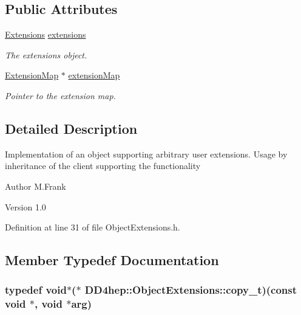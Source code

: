 \subsection*{Public Attributes}
\begin{DoxyCompactItemize}
\item 
\hyperlink{class_d_d4hep_1_1_object_extensions_a882c1e22567a450f60d83eb735dd3532}{Extensions} \hyperlink{class_d_d4hep_1_1_object_extensions_ac96afa01e09dec7a795c88b67c054007}{extensions}
\begin{DoxyCompactList}\small\item\em The extensions object. \item\end{DoxyCompactList}\item 
\hyperlink{class_d_d4hep_1_1_object_extensions_a22c0e42d5fdc9f3fda39c2c3bec14341}{ExtensionMap} $\ast$ \hyperlink{class_d_d4hep_1_1_object_extensions_a6f517da18e14dc6f4de73a48744e8262}{extensionMap}
\begin{DoxyCompactList}\small\item\em Pointer to the extension map. \item\end{DoxyCompactList}\end{DoxyCompactItemize}


\subsection{Detailed Description}
Implementation of an object supporting arbitrary user extensions. Usage by inheritance of the client supporting the functionality

\begin{DoxyAuthor}{Author}
M.Frank 
\end{DoxyAuthor}
\begin{DoxyVersion}{Version}
1.0 
\end{DoxyVersion}


Definition at line 31 of file ObjectExtensions.h.

\subsection{Member Typedef Documentation}
\hypertarget{class_d_d4hep_1_1_object_extensions_ab58b60490186d1adc0c5585ad691a7c2}{
\subsubsection[{copy\_\-t}]{\setlength{\rightskip}{0pt plus 5cm}typedef void$\ast$($\ast$ {\bf DD4hep::ObjectExtensions::copy\_\-t})(const void $\ast$, void $\ast$arg)}}
\label{class_d_d4hep_1_1_object_extensions_ab58b60490186d1adc0c5585ad691a7c2}


